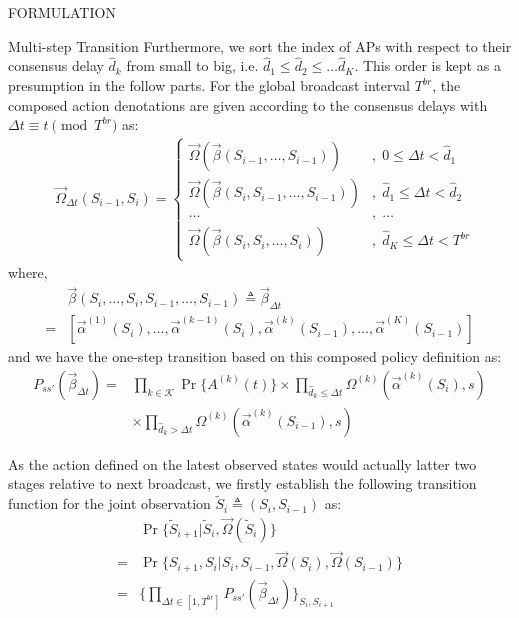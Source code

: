 \documentclass[10pt, conference, letterpaper]{IEEEtran}
\begin{document}
\begin{section}{FORMULATION}
\begin{subsection}{Multi-step Transition}
            Furthermore, we sort the index of APs with respect to their consensus delay $\hat{d}_k$ from small to big, i.e. $\hat{d}_1 \leq \hat{d}_2 \leq \dots \hat{d}_{K}$. This order is kept as a presumption in the follow parts. For the global broadcast interval $T^{br}$, the composed action denotations are given according to the consensus delays with $\Delta{t} \equiv t \pmod{T^{br}}$ as:
            \begin{align}
                &\vec{\Omega}_{\Delta{t}}(S_{i-1},S_{i}) = 
                \begin{cases}
                    \vec{\Omega}(\vec{\beta}(S_{i-1}, \dots, S_{i-1})) &,\; 0 \leq \Delta{t} < \hat{d}_1 \\
                    \vec{\Omega}(\vec{\beta}(S_{i}, S_{i-1}, \dots, S_{i-1})) &,\; \hat{d}_1 \leq \Delta{t}< \hat{d}_2 \\
                    \dots &,\; \dots \\
                    \vec{\Omega}(\vec{\beta}(S_{i}, S_{i}, \dots, S_{i})) &,\; \hat{d}_{K} \leq \Delta{t} < T^{br}
                \end{cases}
            \end{align}
            where,
            \begin{align}
                & \vec{\beta}(S_i,\dots, S_i,S_{i-1}, \dots,S_{i-1}) \triangleq \vec{\beta}_{\Delta{t}}
                \nonumber\\
                = & [\vec{\alpha}^{(1)}(S_i),\dots,\vec{\alpha}^{(k-1)}(S_i),
                    \vec{\alpha}^{(k)}(S_{i-1}),\dots,\vec{\alpha}^{(K)}(S_{i-1})]
            \end{align}
            and we have the one-step transition based on this composed policy definition as:
            \begin{align}
                P_{ss'}(\vec{\beta}_{\Delta{t}}) =& \prod_{k\in\mathcal{K}}{\Pr\{A^{(k)}(t)\}} \times \prod_{\hat{d}_k \leq \Delta{t}} { \Omega^{(k)}(\vec{\alpha}^{(k)}(S_{i}), s)}
                \nonumber \\
                & \times \prod_{\hat{d}_k > \Delta{t}} { \Omega^{(k)}(\vec{\alpha}^{(k)}(S_{i-1}), s) }
            \end{align}

            As the action defined on the latest observed states would actually latter two stages relative to next broadcast, we firstly establish the following transition function for the joint observation $\tilde{S}_i \triangleq (S_{i}, S_{i-1})$ as:
            \begin{align}
                & \Pr\{\tilde{S}_{i+1} | \tilde{S}_{i}, \vec{\Omega}(\tilde{S}_i)\}
                \nonumber\\
                = & \Pr\{S_{i+1}, S_{i} | S_{i},S_{i-1}, \vec{\Omega}(S_{i}), \vec{\Omega}(S_{i-1})\}
                \nonumber\\
                = & \{
                        \prod_{\Delta{t} \in [1,T^{br}]} P_{ss'}(\vec{\beta}_{\Delta{t}})
                    \}_{S_{i}, S_{i+1}}
            \end{align}
        \end{subsection}
        

\end{section}
\end{document}
